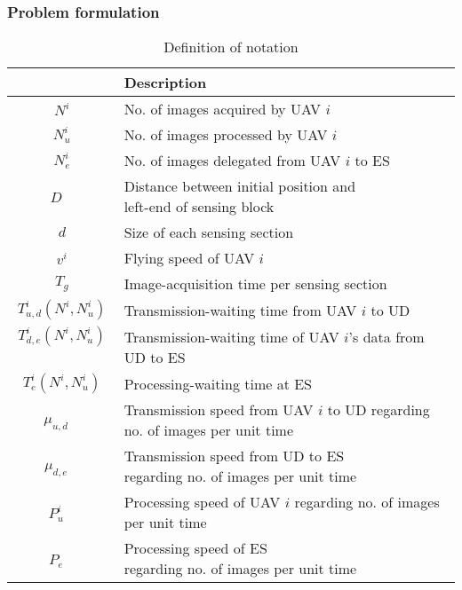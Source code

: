 \documentclass{ieeeaccess}
\begin{document}
\subsubsection{Problem formulation}

\begin{table}[t]
\centering
\caption{Definition of notation}
  \begin{tabular}{|c|l|} \hline
 & Description
 \\ \hline
 $N^i$ & No. of images acquired by UAV $i$ \\ \hline
 $N_u^i$ & No. of images processed by UAV $i$ \\ \hline
 $N_e^i$ & No. of images delegated from UAV $i$ to ES   \\ \hline
 \shortstack[l]{$D$\\ ~}& \shortstack[l]{Distance between initial position and \\left-end of sensing block} \\ \hline
 $d$ & Size of each sensing section     \\ \hline
  $v^{i}$ & Flying speed of UAV $i$    \\ \hline
 $T_g$ & Image-acquisition time per sensing section \\ \hline
  $T_{u,d}^{i}(N^i,N_u^i)$ & Transmission-waiting time from UAV $i$ to UD  \\ \hline
 \shortstack[l]{$T_{d,e}^{i}(N^i,N_u^i)$\\ ~} & \shortstack[l]{Transmission-waiting time of UAV $i$'s data\\from UD to ES}  \\ \hline
 $T_e^{i}(N^i,N_u^i)$ & Processing-waiting time at ES  \\ \hline
 \shortstack[l]{$\mu_{u,d}$\\ ~} & \shortstack[l]{Transmission speed from UAV $i$ to UD\\regarding no. of images per unit time} \\ \hline
 \shortstack[l]{$\mu_{d,e}$\\ ~} &  \shortstack[l]{Transmission speed from UD to ES\\regarding no. of images per unit time} \\ \hline
 \shortstack[l]{$P_u^i$\\ ~} &  \shortstack[l]{Processing speed of UAV $i$\\regarding no. of images per unit time} \\ \hline
 \shortstack[l]{$P_e$\\ ~} &   \shortstack[l]{Processing speed of ES\\regarding no. of images per unit time} \\ \hline
\end{tabular}
\label{para}
\end{table}
\end{document}
